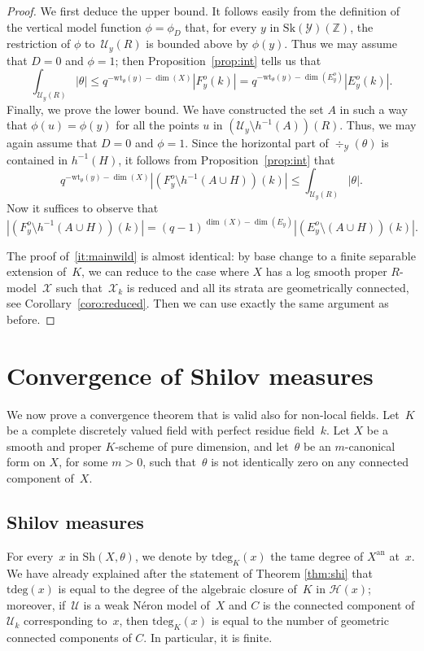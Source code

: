 \documentclass[11pt]{article}
\theoremstyle{definition}
\numberwithin{equation}{subsection}
\newcommand{\Z}{\ensuremath{\mathbb{Z}}}
\newcommand{\cX}{\ensuremath{\mathscr{X}}}
\newcommand{\cU}{\ensuremath{\mathscr{U}}}
\newcommand{\cY}{\ensuremath{\mathscr{Y}}}
\newcommand{\an}{\mathrm{an}}
\newcommand{\Sh}{\mathrm{Sh}}
\newcommand{\Sk}{\mathrm{Sk}}
\newcommand{\tdeg}{\mathrm{tdeg}}
\newcommand{\wt}{\mathrm{wt}}
\let\form\theta
\begin{document}
\begin{proof}
We first deduce the upper bound. It follows easily from the definition of the vertical model function $\phi=\phi_D$ that,
for every $y$ in $\Sk(\cY)(\Z)$, the restriction of $\phi$ to~$\cU_y(R)$ is bounded above by $\phi(y)$.
Thus we may assume that $D=0$ and $\phi=1$; then Proposition~\ref{prop:int} tells us that
\[
\int_{\cU_y(R)}|\form|\leq q^{-\wt_{\form}(y)-\dim(X)}|F^o_y(k)|= q^{-\wt_{\form}(y)-\dim(E^o_y)}|E^o_y(k)|.
\]
Finally, we prove the lower bound. We have constructed the set $A$ in such a way that $\phi(u)=\phi(y)$ for all the points
$u$ in $(\cU_y\setminus h^{-1}(A))(R)$. Thus, we may again assume that $D=0$ and $\phi=1$. Since the horizontal part of $\div_{\cY}(\form)$ is contained in $h^{-1}(H)$, it follows from Proposition~\ref{prop:int} that
\[
q^{-\wt_{\form}(y)-\dim(X)}|(F_y^o\setminus h^{-1}(A\cup H))(k)| \leq \int_{\cU_y(R)}|\form|.
\]
Now it suffices to observe that
\[
|(F_y^o\setminus h^{-1}(A\cup H))(k)|=(q-1)^{\dim(X)-\dim(E_y)}|(E_y^o\setminus (A\cup H))(k)|.
\]

The proof of~\eqref{it:mainwild} is almost identical: by base change to a finite separable extension of~$K$, we can reduce to the case where $X$ has a log smooth proper $R$\nobreakdash-model~$\cX$ such that~$\cX_k$ is reduced and all its strata are geometrically connected, see Corollary~\ref{coro:reduced}. Then we can use exactly the same argument as before.
\end{proof}

\section{Convergence of Shilov measures}\label{sec:convshilov}
We now prove a convergence theorem that is valid also for non-local fields.
Let~$K$ be a complete discretely valued field with perfect residue field~$k$.
Let $X$ be a smooth and proper $K$\nobreakdash-scheme of pure dimension, and let~$\form$ be an $m$-canonical form on $X$, for some $m>0$, such that~$\form$ is not identically zero on any connected component of~$X$.

\subsection{Shilov measures}\label{ss:shimeas}
For every~$x$ in $\Sh(X,\form)$, we denote by $\tdeg_K(x)$ the tame degree of $X^{\an}$ at~$x$.
We have already explained after the statement of Theorem \ref{thm:shi} that $\tdeg(x)$ is equal to the degree of the algebraic closure of~$K$ in $\mathscr{H}(x)$; moreover,
if~$\cU$ is a weak Néron model of~$X$ and $C$ is the connected component of $\cU_k$ corresponding to~$x$, then $\tdeg_K(x)$ is equal to the number of geometric connected components of $C$. In particular, it is finite.
\end{document}
